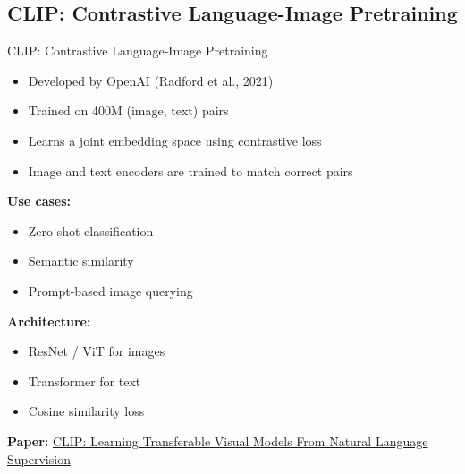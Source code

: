 \subsection{CLIP: Contrastive Language-Image Pretraining}
\begin{frame}[allowframebreaks]{CLIP: Contrastive Language-Image Pretraining}
    \begin{itemize}
        \setlength{\itemsep}{1em}
        \item Developed by OpenAI (Radford et al., 2021)
        \item Trained on 400M (image, text) pairs
        \item Learns a joint embedding space using contrastive loss
        \item Image and text encoders are trained to match correct pairs
    \end{itemize}
    \vspace{0.5em}
    \textbf{Use cases:}
    \begin{itemize}
        \item Zero-shot classification
        \item Semantic similarity
        \item Prompt-based image querying
    \end{itemize}
\framebreak
    \textbf{Architecture:}
    \begin{itemize}
        \setlength{\itemsep}{1em}
        \item ResNet / ViT for images
        \item Transformer for text
        \item Cosine similarity loss
    \end{itemize}
    \vspace{0.5em}
    \textbf{Paper:} \href{https://arxiv.org/abs/2103.00020}{CLIP: Learning Transferable Visual Models From Natural Language Supervision}
\end{frame}


